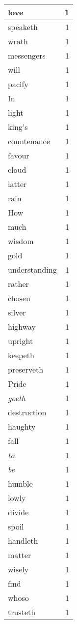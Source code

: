 \begin{center}
\begin{longtable}{l|r}
love & 1\\ \hline 
speaketh & 1\\ \hline 
wrath & 1\\ \hline 
messengers & 1\\ \hline 
will & 1\\ \hline 
pacify & 1\\ \hline 
In & 1\\ \hline 
light & 1\\ \hline 
king's & 1\\ \hline 
countenance & 1\\ \hline 
favour & 1\\ \hline 
cloud & 1\\ \hline 
latter & 1\\ \hline 
rain & 1\\ \hline 
How & 1\\ \hline 
much & 1\\ \hline 
wisdom & 1\\ \hline 
gold & 1\\ \hline 
understanding & 1\\ \hline 
rather & 1\\ \hline 
chosen & 1\\ \hline 
silver & 1\\ \hline 
highway & 1\\ \hline 
upright & 1\\ \hline 
keepeth & 1\\ \hline 
preserveth & 1\\ \hline 
Pride & 1\\ \hline 
\emph{goeth} & 1\\ \hline 
destruction & 1\\ \hline 
haughty & 1\\ \hline 
fall & 1\\ \hline 
\emph{to} & 1\\ \hline 
\emph{be} & 1\\ \hline 
humble & 1\\ \hline 
lowly & 1\\ \hline 
divide & 1\\ \hline 
spoil & 1\\ \hline 
handleth & 1\\ \hline 
matter & 1\\ \hline 
wisely & 1\\ \hline 
find & 1\\ \hline 
whoso & 1\\ \hline 
trusteth & 1\\ \hline 

\end{longtable}
\end{center}
